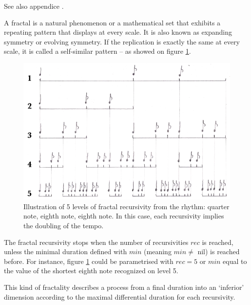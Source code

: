 \label{imp3}

See also appendice . 

{A fractal is a natural phenomenon or a mathematical set that exhibits a repeating pattern that displays at every scale. It is also known as expanding symmetry or evolving symmetry. If the replication is exactly the same at every scale, it is called a self-similar pattern -- as showed on figure \ref{fractal}. 

 }
 
\begin{figure}[H]
\begin{center}
\includegraphics[width=\textwidth]{img/1548}
\caption{Illustration of 5 levels of fractal recursivity from the rhythm: quarter note, eighth note, eighth note. In this case, each recursivity implies the doubling of the tempo.}
\label{fractal}
\end{center}
\end{figure}



The fractal recursivity stops when the number of recursivities $rec$ is reached, unless the minimal duration defined with $min$ (meaning $min \ne$ nil) is reached before. For instance, figure \ref{fractal} could be parametrised with $rec=5$ or $min$ equal to the value of the shortest eighth note recognized on level 5. 

\bigskip 
This kind of fractality describes a process from a final duration into an `inferior' dimension according to the maximal differential duration for each recursivity.  


